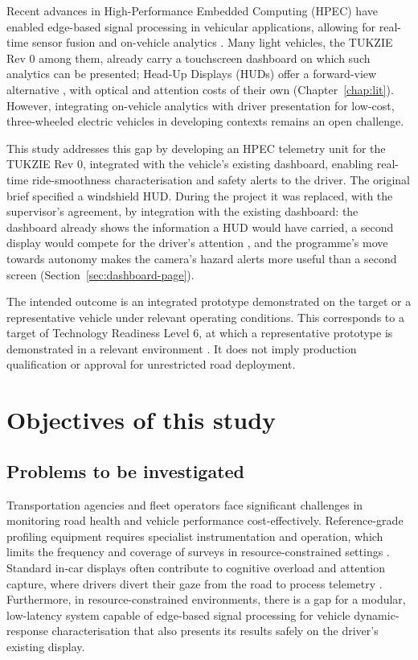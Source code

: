 Recent advances in High-Performance Embedded Computing (HPEC) have enabled edge-based signal processing in vehicular applications, allowing for real-time sensor fusion and on-vehicle analytics \cite{barnell2018}. Many light vehicles, the TUKZIE Rev 0 among them, already carry a touchscreen dashboard on which such analytics can be presented; Head-Up Displays (HUDs) offer a forward-view alternative \cite{mareska2022, canomarin2016}, with optical and attention costs of their own (Chapter~\ref{chap:lit}). However, integrating on-vehicle analytics with driver presentation for low-cost, three-wheeled electric vehicles in developing contexts remains an open challenge.

This study addresses this gap by developing an HPEC telemetry unit for the TUKZIE Rev 0, integrated with the vehicle's existing dashboard, enabling real-time ride-smoothness characterisation and safety alerts to the driver. The original brief specified a windshield HUD. During the project it was replaced, with the supervisor's agreement, by integration with the existing dashboard: the dashboard already shows the information a HUD would have carried, a second display would compete for the driver's attention \cite{zhu2021}, and the programme's move towards autonomy makes the camera's hazard alerts more useful than a second screen (Section~\ref{sec:dashboard-page}).

The intended outcome is an integrated prototype demonstrated on the target or a representative vehicle under relevant operating conditions. This corresponds to a target of Technology Readiness Level 6, at which a representative prototype is demonstrated in a relevant environment \cite{kimmel2020}. It does not imply production qualification or approval for unrestricted road deployment.

\section{Objectives of this study}

\subsection{Problems to be investigated}

Transportation agencies and fleet operators face significant challenges in monitoring road health and vehicle performance cost-effectively. Reference-grade profiling equipment requires specialist instrumentation and operation, which limits the frequency and coverage of surveys in resource-constrained settings \cite{fhwa2016, alatoom2025}. Standard in-car displays often contribute to cognitive overload and attention capture, where drivers divert their gaze from the road to process telemetry \cite{zhu2021}. Furthermore, in resource-constrained environments, there is a gap for a modular, low-latency system capable of edge-based signal processing for vehicle dynamic-response characterisation that also presents its results safely on the driver's existing display.

